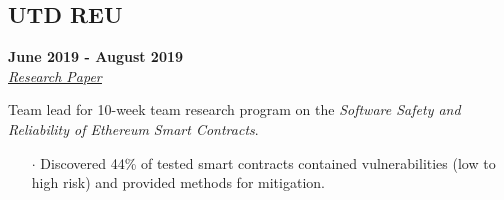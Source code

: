 \documentclass[10pt]{article}
\begin{document}
\begin{paracol}{2}
    \begin{leftcolumn} \vspace{-.36cm}
        \sloppy
        \subsection*{UTD REU}
        \textbf{June 2019 - August 2019} \\
        \textit{\href{https://docs.google.com/document/d/1dJC4ZizbYnmTteADl6h6h520fjsair8w0PfatGXwfqI/edit?usp=sharing}{\underline{Research Paper}}}
    \end{leftcolumn}

    \begin{rightcolumn}
        \begin{flushleft} \vspace{-.5mm}           
            Team lead for 10-week team research program on the \textit{Software Safety and Reliability of Ethereum Smart Contracts}.
        \end{flushleft}
        \vspace{-.6cm}
        \begin{itemize}[leftmargin=.28cm, itemsep=1pt]
            \item[$\cdot$] Discovered 44\% of tested smart contracts contained vulnerabilities (low to high risk) and provided methods for mitigation.
        \end{itemize}
    \end{rightcolumn}
\end{paracol}
\end{document}
